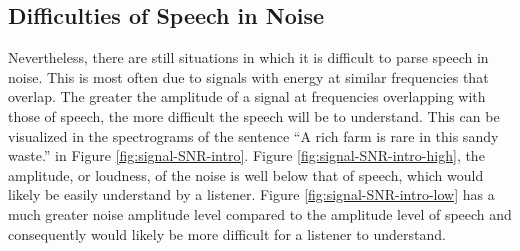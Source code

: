 \subsection{Difficulties of Speech in Noise}\DIFaddbegin \label{sec:snr-difficult}
\DIFaddend 

Nevertheless, there are still situations in which it is difficult to parse speech in noise.  This is most often due to signals with energy at similar frequencies that overlap.  The greater the amplitude of a signal at frequencies overlapping with those of speech, the more difficult the speech will be to understand.  This can be visualized in the spectrograms of the sentence ``A rich farm is rare in this sandy waste.'' in Figure \ref{fig:signal-SNR-intro}.  \DIFdelbegin {}\DIFdelend \DIFaddbegin {}\DIFaddend Figure \ref{fig:signal-SNR-intro-high}, the amplitude, or loudness, of the noise is well below that of speech, which would likely be easily understand by a listener.  Figure \ref{fig:signal-SNR-intro-low} has a much greater noise amplitude level compared to the amplitude level of speech and consequently would likely be more difficult for a listener to understand.
\DIFdelbegin %

{%
\textit{} %
}
{%
\textit{} %
}
{%
}
\DIFdelend 

